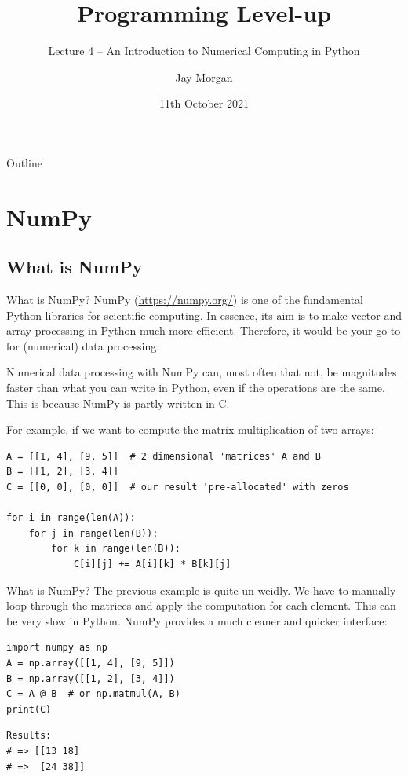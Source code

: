 \documentclass[10pt]{beamer}
\author{Jay Morgan}
\date{11th October 2021}
\title{Programming Level-up}
\subtitle{Lecture 4 -- An Introduction to Numerical Computing in Python}
\begin{document}
\maketitle
\begin{frame}{Outline}
\tableofcontents
\end{frame}


\section{NumPy}
\label{sec:org3c26f4f}

\subsection{What is NumPy}
\label{sec:org8e3defc}

\begin{frame}[label={sec:org0046749},fragile]{What is NumPy?}
 NumPy (\url{https://numpy.org/}) is one of the fundamental Python libraries for scientific
computing. In essence, its aim is to make vector and array processing in Python much
more efficient. Therefore, it would be your go-to for (numerical) data
processing.

Numerical data processing with NumPy can, most often that not, be magnitudes faster
than what you can write in Python, even if the operations are the same. This is
because NumPy is partly written in C.

For example, if we want to compute the matrix multiplication of two arrays:

\begin{verbatim}
A = [[1, 4], [9, 5]]  # 2 dimensional 'matrices' A and B
B = [[1, 2], [3, 4]]
C = [[0, 0], [0, 0]]  # our result 'pre-allocated' with zeros

for i in range(len(A)):
    for j in range(len(B)):
        for k in range(len(B)):
            C[i][j] += A[i][k] * B[k][j]
\end{verbatim}
\end{frame}

\begin{frame}[label={sec:orgbe0b003},fragile]{What is NumPy?}
 The previous example is quite un-weidly. We have to manually loop through the
matrices and apply the computation for each element. This can be \alert{very} slow in
Python. NumPy provides a much cleaner and quicker interface:

\begin{verbatim}
import numpy as np
A = np.array([[1, 4], [9, 5]])
B = np.array([[1, 2], [3, 4]])
C = A @ B  # or np.matmul(A, B)
print(C)
\end{verbatim}

\begin{verbatim}
Results: 
# => [[13 18]
# =>  [24 38]]
\end{verbatim}
\end{frame}
\end{document}
